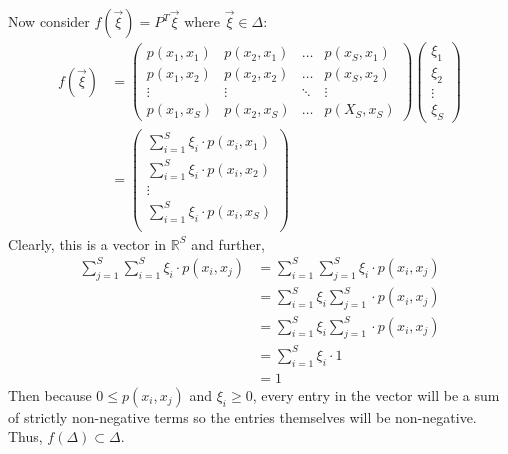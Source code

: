 \documentclass[11pt,letterpaper, leqno]{article}
\numberwithin{equation}{section}
\numberwithin{theorem}{section}
\numberwithin{lemma}{section}
\numberwithin{corollary}{section}
\numberwithin{definition}{section}
\numberwithin{proposition}{section}
\numberwithin{remark}{section}
\numberwithin{example}{section}
\newcommand{\R}{\mathbb{R}}
\begin{document}
\begin{enumerate}
            Now consider $f(\vec \xi) = P^T \vec \xi$ where $\vec \xi \in \Delta$:
            \begin{align*}
                f(\vec \xi) &= \begin{pmatrix}
                    p(x_1, x_1) & p(x_2, x_1) & \dots & p(x_S, x_1)\\
                    p(x_1, x_2) & p(x_2, x_2) & \dots & p(x_S, x_2)\\
                    \vdots & \vdots & \ddots & \vdots\\
                    p(x_1, x_S) & p(x_2, x_S) & \dots & p(X_S, x_S)
                \end{pmatrix} \begin{pmatrix}
                    \xi_1\\
                    \xi_2\\
                    \vdots\\
                    \xi_S
                \end{pmatrix}\\
                &= \begin{pmatrix}
                    \sum_{i=1}^S \xi_i\cdot p(x_i, x_1)\\
                    \sum_{i=1}^S \xi_i\cdot  p(x_i, x_2)\\
                    \vdots\\
                    \sum_{i=1}^S \xi_i \cdot p(x_i, x_S)\\
                \end{pmatrix}
            \end{align*}
            Clearly, this is a vector in $\R^S$ and further, 
            \begin{align*}
                \sum_{j=1}^S \sum_{i=1}^S \xi_i \cdot p(x_i, x_j) &= \sum_{i=1}^S \sum_{j=1}^S \xi_i \cdot p(x_i, x_j)\\
                &= \sum_{i=1}^S \xi_i \sum_{j=1}^S \cdot p(x_i, x_j)\\
                &= \sum_{i=1}^S \xi_i \sum_{j=1}^S \cdot p(x_i, x_j)\\
                &= \sum_{i=1}^S \xi_i \cdot 1\\
                &= 1
            \end{align*}
            Then because $0 \leq p(x_i, x_j)$ and $\xi_i \geq 0$, every entry in the vector will be a sum of strictly non-negative terms so the entries themselves will be non-negative. Thus,
            $f(\Delta) \subset \Delta$. 
            

\end{enumerate}
\end{document}
